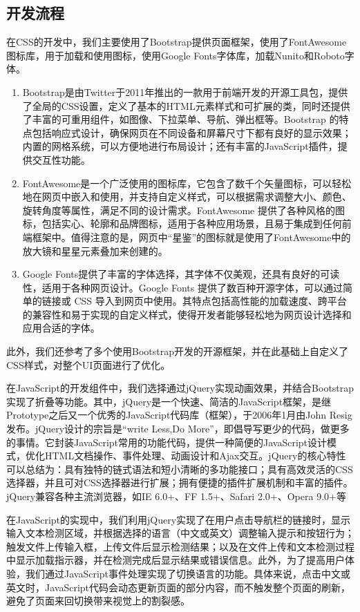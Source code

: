 \documentclass[a4paper]{report}
\begin{document}
\subsection{开发流程}
在CSS的开发中，我们主要使用了Bootstrap提供页面框架，使用了FontAwesome图标库，用于加载和使用图标，使用Google Fonts字体库，加载Nunito和Roboto字体。
\begin{enumerate}
	\item Bootstrap是由Twitter于2011年推出的一款用于前端开发的开源工具包，提供了全局的CSS设置，定义了基本的HTML元素样式和可扩展的类，同时还提供了丰富的可重用组件，如图像、下拉菜单、导航、弹出框等。Bootstrap 的特点包括响应式设计，确保网页在不同设备和屏幕尺寸下都有良好的显示效果；内置的网格系统，可以方便地进行布局设计；还有丰富的JavaScript插件，提供交互性功能。
	\item FontAwesome是一个广泛使用的图标库，它包含了数千个矢量图标，可以轻松地在网页中嵌入和使用，并支持自定义样式，可以根据需求调整大小、颜色、旋转角度等属性，满足不同的设计需求。FontAwesome 提供了各种风格的图标，包括实心、轮廓和品牌图标，适用于各种应用场景，且易于集成到任何前端框架中。值得注意的是，网页中“星鉴”的图标就是使用了FontAwesome中的放大镜和星星元素叠加来创建的。
	\item Google Fonts提供了丰富的字体选择，其字体不仅美观，还具有良好的可读性，适用于各种网页设计。Google Fonts 提供了数百种开源字体，可以通过简单的链接或 CSS 导入到网页中使用。其特点包括高性能的加载速度、跨平台的兼容性和易于实现的自定义样式，使得开发者能够轻松地为网页设计选择和应用合适的字体。
\end{enumerate}
此外，我们还参考了多个使用Bootstrap开发的开源框架，并在此基础上自定义了CSS样式，对整个UI页面进行了优化。

在JavaScript的开发组件中，我们选择通过jQuery实现动画效果，并结合Bootstrap实现了折叠等功能。其中，jQuery是一个快速、简洁的JavaScript框架，是继Prototype之后又一个优秀的JavaScript代码库（框架），于2006年1月由John Resig发布。jQuery设计的宗旨是“write Less,Do More”，即倡导写更少的代码，做更多的事情。它封装JavaScript常用的功能代码，提供一种简便的JavaScript设计模式，优化HTML文档操作、事件处理、动画设计和Ajax交互。jQuery的核心特性可以总结为：具有独特的链式语法和短小清晰的多功能接口；具有高效灵活的CSS选择器，并且可对CSS选择器进行扩展；拥有便捷的插件扩展机制和丰富的插件。jQuery兼容各种主流浏览器，如IE 6.0+、FF 1.5+、Safari 2.0+、Opera 9.0+等

在JavaScript的实现中，我们利用jQuery实现了在用户点击导航栏的链接时，显示输入文本检测区域，并根据选择的语言（中文或英文）调整输入提示和按钮行为；触发文件上传输入框，上传文件后显示检测结果；以及在文件上传和文本检测过程中显示加载指示器，并在检测完成后显示结果或错误信息。此外，为了提高用户体验，我们通过JavaScript事件处理实现了切换语言的功能。具体来说，点击中文或英文时，JavaScript代码会动态更新页面的部分内容，而不触发整个页面的刷新，避免了页面来回切换带来视觉上的割裂感。
\end{document}
